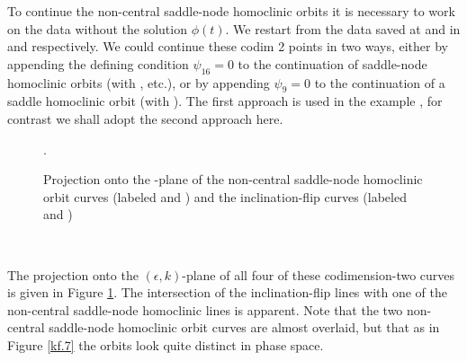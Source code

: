 \documentclass[12pt]{report}
\def\eps{\epsilon}
\begin{document}
To continue the non-central saddle-node homoclinic orbits it is
necessary to work on the data without the solution $\phi(t)$. We
restart from the data saved at  and  in
 and  respectively. We could continue these codim 2 points in two
ways, either by appending the defining condition $\psi_{16} =0$ to
the continuation of saddle-node homoclinic orbits (with ,
etc.), or by appending $\psi_{9} =0$ to the continuation 
of a saddle homoclinic orbit (with ). 
The first approach is used in the example ,  
for contrast we shall adopt the second approach here.
\begin{figure}[p]
\epsfysize 9.0cm
\centerline{}
\caption{Projection onto the -plane of the non-central
saddle-node homoclinic orbit curves (labeled  and ) and the 
inclination-flip curves (labeled  and )}.
\label{kp.10}
\end{figure}
%
\begin{center}
\\
\end{center}
The projection onto the $(\eps,k)$-plane of all four of these
codimension-two curves is given in Figure \ref{kp.10}. 
The intersection of the inclination-flip lines with one of the
non-central saddle-node homoclinic lines is apparent. Note that the two
non-central saddle-node homoclinic orbit curves are almost overlaid, but
that as in Figure \ref{kf.7} the orbits look quite distinct in phase space.
\end{document}
